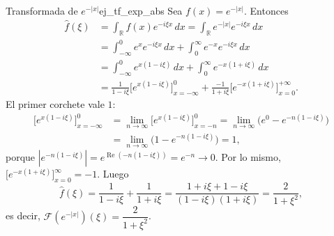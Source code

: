 \begin{ejemplo}{Transformada de $e^{-|x|}$}{ej_tf_exp_abs}
Sea $f(x) = e^{-|x|}$. Entonces
\begin{align*}
\hat{f}(\xi) &= \int_{\mathbb{R}}f(x)e^{-i\xi x}\,dx = \int_{\mathbb{R}}e^{-|x|}e^{-i\xi x}\,dx \\
&= \int_{-\infty}^{0}e^{x}e^{-i\xi x}\,dx + \int_{0}^{\infty}e^{-x}e^{-i\xi x}\,dx \\
&= \int_{-\infty}^{0}e^{x(1-i\xi)}\,dx + \int_{0}^{\infty}e^{-x(1+i\xi)}\,dx \\
&= \frac{1}{1-i\xi}\Big[e^{x(1-i\xi)}\Big]_{x=-\infty}^{0} + \frac{-1}{1+i\xi}\Big[e^{-x(1+i\xi)}\Big]_{x=0}^{+\infty}.
\end{align*}
El primer corchete vale $1$:
\begin{align*}
\Big[e^{x(1-i\xi)}\Big]_{x=-\infty}^{0} &= \lim_{n\to\infty}\Big[e^{x(1-i\xi)}\Big]_{x=-n}^{0} = \lim_{n\to\infty}\big(e^{0} - e^{-n(1-i\xi)}\big) \\
&= \lim_{n\to\infty}\big(1 - e^{-n(1-i\xi)}\big) = 1,
\end{align*}
porque $|e^{-n(1-i\xi)}| = e^{\operatorname{Re}(-n(1-i\xi))} = e^{-n} \to 0$. Por lo mismo, $\Big[e^{-x(1+i\xi)}\Big]_{x=0}^{\infty} = -1$. Luego
\[
\hat{f}(\xi) = \frac{1}{1-i\xi} + \frac{1}{1+i\xi} = \frac{1+i\xi + 1-i\xi}{(1-i\xi)(1+i\xi)} = \frac{2}{1+\xi^2},
\]
es decir, $\mathcal{F}(e^{-|x|})(\xi) = \dfrac{2}{1+\xi^2}$.
\end{ejemplo}

